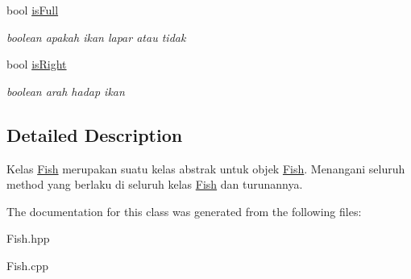 \begin{DoxyCompactItemize}
\mbox{\label{classFish_af2e4a0561696f400efbb196c937f04cb}} 
bool \hyperlink{classFish_af2e4a0561696f400efbb196c937f04cb}{is\+Full}
\begin{DoxyCompactList}\small\item\em boolean apakah ikan lapar atau tidak \end{DoxyCompactList}\item 
\mbox{\label{classFish_a24723b3118965b94d4be7a48e31d482b}} 
bool \hyperlink{classFish_a24723b3118965b94d4be7a48e31d482b}{is\+Right}
\begin{DoxyCompactList}\small\item\em boolean arah hadap ikan \end{DoxyCompactList}\end{DoxyCompactItemize}


\subsection{Detailed Description}
Kelas \hyperlink{classFish}{Fish} merupakan suatu kelas abstrak untuk objek \hyperlink{classFish}{Fish}. Menangani seluruh method yang berlaku di seluruh kelas \hyperlink{classFish}{Fish} dan turunannya. 

The documentation for this class was generated from the following files\+:\begin{DoxyCompactItemize}
\item 
Fish.\+hpp\item 
Fish.\+cpp\end{DoxyCompactItemize}
